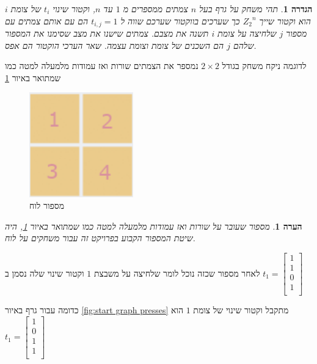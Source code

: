 \documentclass[12pt,twoside]{article}
\newtheorem{definition}{הגדרה}[section]
\newtheorem{comm}{הערה}[section]
\newcommand{\Zn}{{Z_2}^n}
\begin{document}
\newpage

\begin{definition}
    תהי 
    משחק על גרף בעל
    $n$
    צמתים
    ממספרים מ
    $1$
    עד
    $n$,
    וקטור שינוי
    $t_i$
    של צומת  
    $i$
    הוא 
    וקטור 
    שייך 
    $\Zn$
    כך
    שערכים בווקטור 
    שערכם שווה ל
    $t_{i,j} = 1$
    הם עם אותם 
    צמתים 
    עם מספור 
    $j$
    שלחיצה על צומת
    $i$
    תשנה את מצבם.
    צמתים שישנו את מצב 
    שסימנו את המספור שלהם
    $j$
    הם השכנים של צומת
    וצומת עצמה.
    שאר הערכי הוקטור הם אפס.
\end{definition}

לדוגמה ניקח 
משחק בגודל
$2 \times 2$
נמספר את הצמתים 
שורות ואז עמודות מלמעלה למטה כמו שמתואר באיור
\ref{fig:numbering_board_2x2}

\begin{figure}[ht]
    \caption{מספור לוח}
    \label{fig:numbering_board_2x2}
    \centering
    \includegraphics[width=0.4\textwidth,keepaspectratio]{images/numbering_board_2x2.PNG}
\end{figure}

\begin{comm}
    \label{ comm: indexing board game}
    מספור שעובר על שורות ואז עמודות מלמעלה למטה כמו שמתואר באיור
    \ref{fig:numbering_board_2x2},
     היה שיטת המספור הקבוע בפרויקט זה עבור משחקים על לוח.
\end{comm}

לאחר מספור שכזה נוכל לומר שלחיצה על משבצת 
$1$
וקטור שינוי שלה נסמן ב
$
    t_1 = 
    \begin{bmatrix}
        1 \\
        1 \\
        0 \\
        1 \\
    \end{bmatrix}
$

כדומה
עבור גרף באיור
\ref{fig:start graph presses}
מתקבל וקטור שינוי של צומת 
$1$
הוא
$
    t_1 = 
    \begin{bmatrix}
        1 \\
        0 \\
        1 \\
        1 \\
    \end{bmatrix}
$
\end{document}
